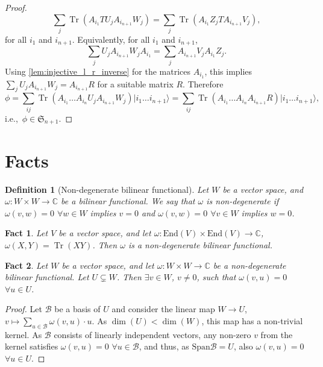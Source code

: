 \documentclass{article}
\newtheorem{fact}{Fact}
\newtheorem{definition}{Definition}
\newcommand{\tr}{\operatorname{Tr}}
\newcommand{\End}{\mathrm{End}}
\newcommand{\ket}[1]{\vert #1 \rangle}
\newcommand{\Span}{\mathrm{Span}}
\begin{document}
\begin{proof}
  \begin{equation*}
    \sum_{j} \tr(A_{i_1} T U_j A_{i_{n+1}} W_j) = \sum_{j} \tr(A_{i_1} Z_j T A_{i_{n+1}} V_j),
  \end{equation*}
  for all $i_1$ and $i_{n+1}$. Equivalently, for all $i_1$ and $i_{n+1}$,
  \begin{equation*}
    \sum_j U_j A_{i_{n+1}} W_j A_{i_1} = \sum_j A_{i_{n+1}} V_j A_{i_1} Z_j. 
  \end{equation*} 
  Using  \cref{lem:injective_l_r_inverse} for the matrices $A_{i_1}$, this implies $\sum_j U_j A_{i_{n+1}} W_j = A_{i_{n+1}} R$ for a suitable matrix $R$. Therefore 
  \begin{equation*}
    \phi = \sum_{ij} \tr(A_{i_1} \dots A_{i_n} U_j A_{i_{n+1}} W_j) \ket{i_1 \dots i_{n+1}} = 
    \sum_{ij} \tr(A_{i_1} \dots A_{i_n} A_{i_{n+1}} R) \ket{i_1 \dots i_{n+1}},
  \end{equation*}
  i.e.,\ $\phi\in \mathfrak{S}_{n+1}$.
\end{proof}

\appendix

\section{Facts}

\begin{definition}[Non-degenerate bilinear functional]\label{def:nondegen_bili_fcnl}
  Let $W$ be a vector space, and $\omega: W\times W\to \mathbb{C}$ be a bilinear functional.
  We say that $\omega$ is non-degenerate if $\omega(v,w) = 0$ $\forall w\in W$ implies $v=0$ and $\omega(v,w) = 0$ $\forall v\in W$ implies $w=0$.
\end{definition}

\begin{fact}\label{fact:tr_nondegen}
  Let $V$ be a vector space, and let $\omega: \End(V)\times\End(V)\to \mathbb{C}$, $\omega(X,Y)= \tr(XY)$. Then $\omega$ is a non-degenerate bilinear functional.
\end{fact}


\begin{fact}
  Let $W$ be a vector space, and let $\omega: W\times W\to \mathbb{C}$ be a non-degenerate bilinear functional. Let $U\subsetneq W$. Then $\exists v\in W$, $v\neq 0$, such that  $\omega(v,u) =0$ $\forall u\in U$.
\end{fact}

\begin{proof}
   Let $\mathcal{B}$ be a basis of $U$ and consider the linear map $W\to U$, $v \mapsto \sum_{u\in \mathcal{B}} \omega(v,u) \cdot u$. As $\dim(U) < \dim(W)$, this map has a non-trivial kernel. As $\mathcal{B}$ consists of linearly independent vectors, any non-zero $v$ from the kernel satisfies $\omega(v,u) = 0$ $\forall u\in\mathcal{B}$, and thus, as $\Span \mathcal{B} = U$, also $\omega(v,u) = 0$ $\forall u \in U$.    
\end{proof}
\end{document}
